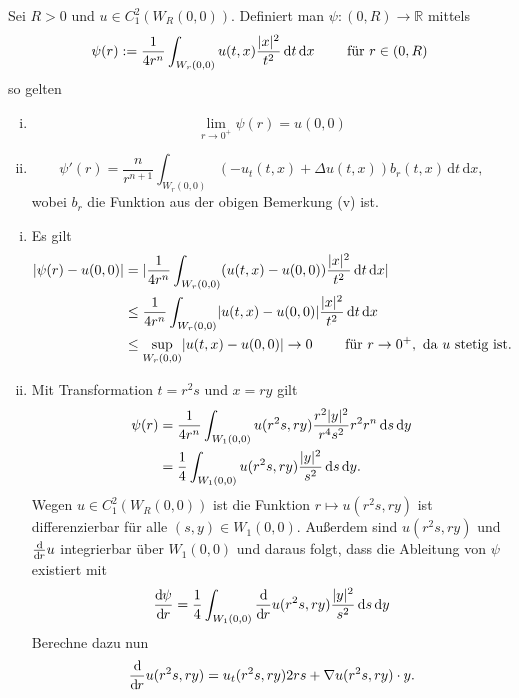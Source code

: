 \begin{lemma}
	Sei $R >0$ und $u \in C^2_1(W_R(0,0))$. Definiert man $\psi : (0,R) \to \mathbb{R}$ mittels
	\[
		\psi(r) := \frac{1}{4 r^n} \int_{W_r(0,0)}^{} u(t,x) \frac{\lvert x\rvert^2}{t^2} \,\mathrm{d}t \,\mathrm{d}x \qquad \text{ für } r \in (0,R)
	\]
	so gelten
	\begin{enumerate}[(i)]
		\item \[
			\lim_{r \to 0^+} \psi(r) = u(0,0)
		\]
		\item \[
			\psi'(r) = \frac{n}{r^{n+1}} \int_{W_r(0,0)}^{} (-u_t(t,x)+ \Delta u(t,x))b_r(t,x) \,\mathrm{d}t \,\mathrm{d}x,
		\] wobei $b_r$ die Funktion aus der obigen Bemerkung (v) ist.
	\end{enumerate}
\end{lemma}
\begin{beweis}
	\begin{enumerate}[(i)]
		\item Es gilt
		\begin{align*}
			\lvert \psi(r) - u(0,0)\rvert &= \lvert \frac{1}{4r^n} \int_{W_r(0,0)}^{} (u(t,x)- u(0,0)) \frac{\lvert x\rvert^2}{t^2} \,\mathrm{d}t \, \mathrm{d}x\rvert \\
			& \leq \frac{1}{4 r^n} \int_{W_r(0,0)}^{} \lvert u(t,x)-u(0,0)\rvert \frac{\lvert x\rvert^2}{t^2} \,\mathrm{d}t \, \mathrm{d}x \\
			& \leq \sup_{W_r(0,0)} \lvert u(t,x)-u(0,0)\rvert \to 0 \qquad \text{ für } r \to 0^+, \text{ da } u \text{ stetig ist.}
		\end{align*}
		\item Mit Transformation $t= r^2 s$ und $x = ry$ gilt
		\begin{align*}
			\psi(r) &= \frac{1}{4 r^n} \int_{W_1(0,0)}^{}u(r^2s,ry) \frac{r^2 \lvert y\rvert^2}{r^4 s^2} r^2 r^n \,\mathrm{d}s \,\mathrm{d}y \\
			&= \frac{1}{4} \int_{W_1(0,0)}^{} u(r^2s,ry) \frac{\lvert y\rvert^2}{s^2} \,\mathrm{d}s \,\mathrm{d}y.
		\end{align*}
		Wegen $u \in C^2_1(W_R(0,0))$ ist die Funktion $r \mapsto  u(r^2s,ry)$ ist differenzierbar für alle $(s,y) \in W_1(0,0)$. Außerdem sind
		$u(r^2s,ry)$ und $\frac{\mathrm{d}\mkern-1.0mu }{\mathrm{d}\mkern-1.0mu r} u$ integrierbar über $W_1(0,0)$ und daraus folgt, dass die Ableitung von $\psi$ existiert mit
		\[
			\frac{\mathrm{d}\mkern-1.0mu \psi}{\mathrm{d}\mkern-1.0mu r}  = \frac{1}{4} \int_{W_1(0,0)}^{} \frac{\mathrm{d}\mkern-1.0mu }{\mathrm{d}\mkern-1.0mu r}  u(r^2s,ry) \frac{\lvert y\rvert^2}{s^2} \,\mathrm{d}s \,\mathrm{d}y
		\]
		Berechne dazu nun
		\begin{align*}
			\frac{\mathrm{d}\mkern-1.0mu }{\mathrm{d}\mkern-1.0mu r} u(r^2s,ry) = u_t(r^2s,ry)2rs+  \nabla u(r^2s,ry)\cdot y.
		\end{align*}

\end{enumerate}
\end{beweis}
